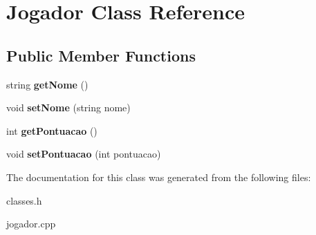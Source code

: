 \hypertarget{classJogador}{}\section{Jogador Class Reference}
\label{classJogador}
\subsection*{Public Member Functions}
\begin{DoxyCompactItemize}
\item 
\mbox{\label{classJogador_ad99c974eb0be82064fbca936adc246d9}} 
string {\bfseries get\+Nome} ()
\item 
\mbox{\label{classJogador_a0d9f47c126ff7fd73863c1bcba346afe}} 
void {\bfseries set\+Nome} (string nome)
\item 
\mbox{\label{classJogador_a3aa048567359dfd36094feac3519e567}} 
int {\bfseries get\+Pontuacao} ()
\item 
\mbox{\label{classJogador_a493a6144f721e6d05570d63e5354588c}} 
void {\bfseries set\+Pontuacao} (int pontuacao)
\end{DoxyCompactItemize}


The documentation for this class was generated from the following files\+:\begin{DoxyCompactItemize}
\item 
classes.\+h\item 
jogador.\+cpp\end{DoxyCompactItemize}
